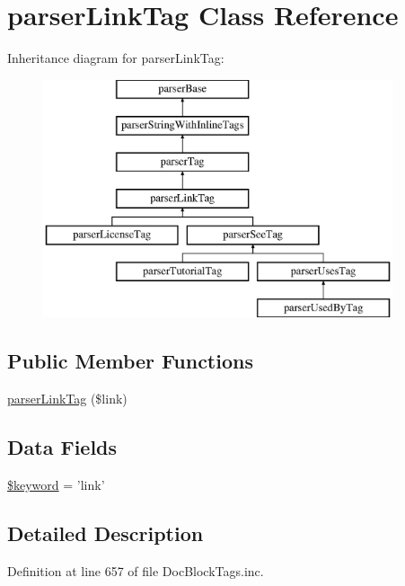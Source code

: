 \hypertarget{classparser_link_tag}{\section{parser\-Link\-Tag \-Class \-Reference}
\label{classparser_link_tag}
}
\-Inheritance diagram for parser\-Link\-Tag\-:\begin{figure}[H]
\begin{center}
\leavevmode
\includegraphics[height=7.000000cm]{classparser_link_tag}
\end{center}
\end{figure}
\subsection*{\-Public \-Member \-Functions}
\begin{DoxyCompactItemize}
\item 
\hyperlink{classparser_link_tag_a38be69c8e2ce158a0172299119d69633}{parser\-Link\-Tag} (\$link)
\end{DoxyCompactItemize}
\subsection*{\-Data \-Fields}
\begin{DoxyCompactItemize}
\item 
\hyperlink{classparser_link_tag_a4a925d6b38bcf3957c713a7d3dc7da1f}{\$keyword} = 'link'
\end{DoxyCompactItemize}


\subsection{\-Detailed \-Description}


\-Definition at line 657 of file \-Doc\-Block\-Tags.\-inc.



